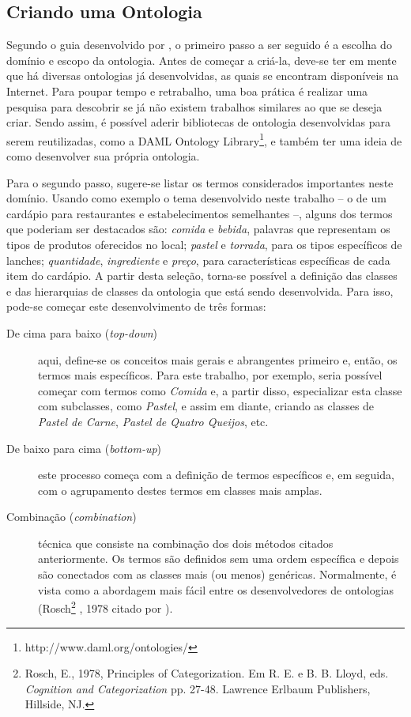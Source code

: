 \subsection{Criando uma Ontologia}
Segundo o guia desenvolvido por \cite{NOY2001}, o primeiro passo a ser seguido é a escolha do domínio e escopo da ontologia. Antes de começar a criá-la, deve-se ter em mente que há diversas ontologias já desenvolvidas, as quais se encontram disponíveis na Internet. Para poupar tempo e retrabalho, uma boa prática é realizar uma pesquisa para descobrir se já não existem trabalhos similares ao que se deseja criar. Sendo assim, é possível aderir bibliotecas de ontologia desenvolvidas para serem reutilizadas, como a DAML Ontology Library\footnote{http://www.daml.org/ontologies/}, e também ter uma ideia de como desenvolver sua própria ontologia.

Para o segundo passo, sugere-se listar os termos considerados importantes neste domínio. Usando como exemplo o tema desenvolvido neste trabalho -- o de um cardápio para restaurantes e estabelecimentos semelhantes --, alguns dos termos que poderiam ser destacados são: \emph{comida} e \emph{bebida}, palavras que representam os tipos de produtos oferecidos no local; \emph{pastel} e \emph{torrada}, para os tipos específicos de lanches; \emph{quantidade}, \emph{ingrediente} e \emph{preço}, para características específicas de cada item do cardápio. A partir desta seleção, torna-se possível a definição das classes e das hierarquias de classes da ontologia que está sendo desenvolvida. Para isso, pode-se começar este desenvolvimento de três formas:
\begin{description}
    \item [De cima para baixo (\emph{top-down})] aqui, define-se os conceitos mais gerais e abrangentes primeiro e, então, os termos mais específicos. Para este trabalho, por exemplo, seria possível começar com termos como \emph{Comida} e, a partir disso, especializar esta classe com subclasses, como \emph{Pastel}, e assim em diante, criando as classes de \emph{Pastel de Carne}, \emph{Pastel de Quatro Queijos}, etc.
    \item [De baixo para cima (\emph{bottom-up})] este processo começa com a definição de termos específicos e, em seguida, com o agrupamento destes termos em classes mais amplas.
    \item [Combinação (\emph{combination})] técnica que consiste na combinação dos dois métodos citados anteriormente. Os termos são definidos sem uma ordem específica e depois são conectados com as classes mais (ou menos) genéricas. Normalmente, é vista como a abordagem mais fácil entre os desenvolvedores de ontologias (Rosch\footnote{Rosch, E., 1978, Principles of Categorization. Em R. E. e B. B. Lloyd, eds. \emph{Cognition and Categorization} pp. 27-48. Lawrence Erlbaum Publishers, Hillside, NJ.} , 1978 citado por \cite{NOY2001}).
\end{description}

